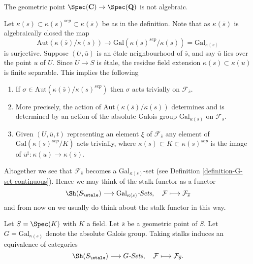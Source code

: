 \begin{example}
\label{example-stupid}
The geometric point
$\Spec(\mathbf{C}) \to \Spec(\mathbf{Q})$
is not algebraic.
\end{example}

\noindent
Let $\kappa(s) \subset \kappa(s)^{sep} \subset \kappa(\overline{s})$
be as in the definition. Note that as $\kappa(\overline{s})$ is algebraically
closed the map
$$
\text{Aut}(\kappa(\overline{s})/\kappa(s))
\longrightarrow
\text{Gal}(\kappa(s)^{sep}/\kappa(s)) = \text{Gal}_{\kappa(s)}
$$
is surjective. Suppose $(U, \overline{u})$ is an
\'etale neighbourhood of $\overline{s}$, and say $\overline{u}$ lies over
the point $u$ of $U$. Since $U \to S$ is \'etale, the residue field extension
$\kappa(s) \subset \kappa(u)$ is finite separable.
This implies the following
\begin{enumerate}
\item If $\sigma \in \text{Aut}(\kappa(\overline{s})/\kappa(s)^{sep})$
then $\sigma$ acts trivially on $\mathcal{F}_{\overline{s}}$.
\item More precisely, the action of
$\text{Aut}(\kappa(\overline{s})/\kappa(s))$
determines and is determined by an action of the absolute Galois group
$\text{Gal}_{\kappa(s)}$ on $\mathcal{F}_{\overline{s}}$.
\item Given $(U, \overline{u}, t)$ representing an element $\xi$ of
$\mathcal{F}_{\overline{s}}$ any element of
$\text{Gal}(\kappa(s)^{sep}/K)$ acts trivially, where
$\kappa(s) \subset K \subset \kappa(s)^{sep}$ is the image of
$\overline{u}^\sharp : \kappa(u) \to \kappa(\overline{s})$.
\end{enumerate}
Altogether we see that $\mathcal{F}_{\overline{s}}$ becomes a
$\text{Gal}_{\kappa(s)}$-set (see
Definition \ref{definition-G-set-continuous}).
Hence we may think of the stalk functor as a functor
$$
\Sh(S_\etale) \longrightarrow
\text{Gal}_{\kappa(s)}\textit{-Sets},
\quad
\mathcal{F} \longmapsto \mathcal{F}_{\overline{s}}
$$
and from now on we usually do think about the stalk functor in this way.

\begin{theorem}
\label{theorem-equivalence-sheaves-point}
Let $S = \Spec(K)$ with $K$ a field.
Let $\overline{s}$ be a geometric point of $S$.
Let $G = \text{Gal}_{\kappa(s)}$ denote the absolute Galois group.
Taking stalks induces an equivalence of categories
$$
\Sh(S_\etale) \longrightarrow G\textit{-Sets},
\quad
\mathcal{F} \longmapsto \mathcal{F}_{\overline{s}}.
$$
\end{theorem}

